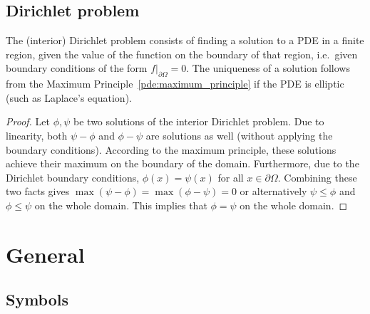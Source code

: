 \subsection{Dirichlet problem}

    The (interior) Dirichlet problem consists of finding a solution to a PDE in a finite region, given the value of the function on the boundary of that region, i.e.~given boundary conditions of the form $f|_{\partial\Omega}=0$. The uniqueness of a solution follows from the Maximum Principle~\ref{pde:maximum_principle} if the PDE is elliptic (such as Laplace's equation).
    \begin{proof}
        Let $\phi,\psi$ be two solutions of the interior Dirichlet problem. Due to linearity, both $\psi-\phi$ and $\phi-\psi$ are solutions as well (without applying the boundary conditions). According to the maximum principle, these solutions achieve their maximum on the boundary of the domain. Furthermore, due to the Dirichlet boundary conditions, $\phi(x)=\psi(x)$ for all $x\in\partial\Omega$. Combining these two facts gives $\max(\psi-\phi) = \max(\phi-\psi) = 0$ or alternatively $\psi\leq\phi$ and $\phi\leq\psi$ on the whole domain. This implies that $\phi=\psi$ on the whole domain.
    \end{proof}



\section{General}\label{section:pde_general}
\subsection{Symbols}

